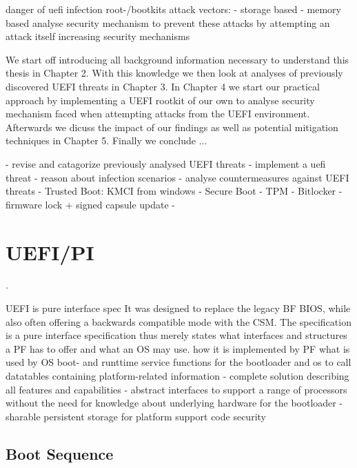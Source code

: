 danger of uefi infection
root-/bootkits
attack vectors:
- storage based
- memory based
analyse security mechanism to prevent these attacks by attempting an attack itself
increasing security mechanisms

We start off introducing all background information necessary to understand this thesis in Chapter 2. With this knowledge we then look at analyses of previously discovered UEFI threats in Chapter 3. In Chapter 4 we start our practical approach by implementing a UEFI rootkit of our own to analyse security mechanism faced when attempting attacks from the UEFI environment. Afterwards we dicuss the impact of our findings as well as potential mitigation techniques in Chapter 5. Finally we conclude ...

- revise and catagorize previously analysed UEFI threats
- implement a uefi threat
- reason about infection scenarios
- analyse countermeasures against UEFI threats
- Trusted Boot: KMCI from windows
- Secure Boot
- TPM
- Bitlocker
- firmware lock + signed capsule update
-

\section{\acs{UEFI}/\acs{PI}}
.

UEFI is pure interface spec
\cite{beyond-bios}
It was designed to replace the legacy \acl{BF} \ac{BIOS}, while also often offering a backwards compatible mode with the \acf{CSM}.
The specification is a pure interface specification thus merely states what interfaces and structures a \ac{PF} has to offer and what an \ac{OS} may use.
how it is implemented by PF
what is used by OS
boot- and runttime service functions for the bootloader and os to call
datatables containing platform-related information
- complete solution describing all features and capabilities
- abstract interfaces to support a range of processors without the need for knowledge about underlying hardware for the bootloader
- sharable persistent storage for platform support code
security

\subsection{Boot Sequence}

